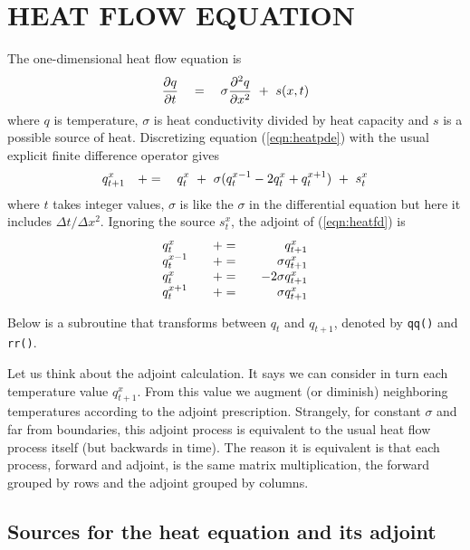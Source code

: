 \section{HEAT FLOW EQUATION}
The one-dimensional heat flow equation is
\begin{equation}
{\partial q \over \partial t} \quad =\quad \sigma
{\partial^2 q \over \partial x^2} \ +\ s(x,t)
\label{eqn:heatpde}
\end{equation}
where $q$ is temperature,
$\sigma$ is heat conductivity divided by heat capacity
and $s$ is a possible source of heat.
Discretizing equation (\ref{eqn:heatpde}) with the usual explicit
finite difference operator gives
\begin{equation}
q_{t+1}^x \quad +=\quad q_t^x  \ +\ \sigma ( q_t^{x-1}-2q_t^x+q_t^{x+1} ) \ +\ s_t^x
\label{eqn:heatfd}
\end{equation}
where $t$ takes integer values,
$\sigma$ is like the $\sigma$ 
in the differential equation but here it includes
$\Delta t/\Delta x^2$.
Ignoring the source $s_t^x$, the adjoint of (\ref{eqn:heatfd}) is
\begin{equation}
\begin{array}{lcr}
q_t^x     &\quad +=\quad&           q_{t+1}^x  	\\
q_t^{x-1} &\quad +=\quad&    \sigma q_{t+1}^x		\\
q_t^{x  } &\quad +=\quad&  -2\sigma q_{t+1}^x 	\\
q_t^{x+1} &\quad +=\quad&    \sigma q_{t+1}^x 
\end{array}
\end{equation}

Below is a %
subroutine that transforms between $q_t$ and $q_{t+1}$,
denoted by {\tt qq()} and {\tt rr()}.


Let us think about the adjoint calculation.
It says we can consider in turn
each temperature value $q_{t+1}^x$.
From this value we augment (or diminish)
neighboring temperatures according to the adjoint prescription.
Strangely, for constant $\sigma$ and far from boundaries,
this adjoint process is equivalent to the usual
heat flow process itself (but backwards in time).
The reason it is equivalent is that each process, forward and adjoint,
is the same matrix multiplication, the forward grouped by rows
and the adjoint grouped by columns.



\subsection{Sources for the heat equation and its adjoint}


